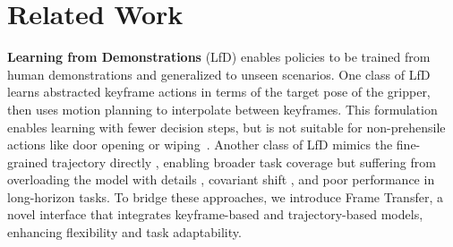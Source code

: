 \section{Related Work}

\textbf{Learning from Demonstrations} (LfD) enables policies to be trained from human demonstrations and generalized to unseen scenarios. 
One class of LfD learns abstracted keyframe actions \cite{james2022q, james2022coarse, shridhar2023perceiver, gervet2023act3d, goyal2023rvt} in terms of the target pose of the gripper, then uses motion planning to interpolate between keyframes. This formulation enables learning with fewer decision steps, but is not suitable for non-prehensile actions like door opening or wiping~\cite{xian2023chaineddiffuser, ma2024hierarchical}.
Another class of LfD mimics the fine-grained trajectory directly
\cite{song2020grasping, ye2022bagging, toyer2020magical, zhang2018deep, chi2023diffusionpolicy, zhu2023viola, mandlekar2021matters, zhao2023learning, wang2024equivariant}, enabling broader task coverage but suffering from overloading
the model with details \cite{zhao2023learning}, covariant shift \cite{ke2021grasping}, and poor performance in long-horizon tasks. To bridge these approaches, we introduce Frame Transfer, a novel interface that integrates keyframe-based and trajectory-based models, enhancing flexibility and task adaptability.



